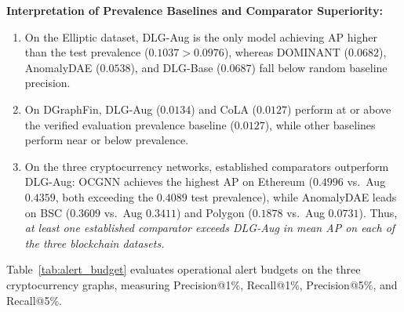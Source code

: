 \documentclass[11pt,a4paper]{article}
\begin{document}
\textbf{Interpretation of Prevalence Baselines and Comparator Superiority:}
\begin{enumerate}
    \item On the Elliptic dataset, DLG-Aug is the only model achieving AP higher than the test prevalence ($0.1037 > 0.0976$), whereas DOMINANT ($0.0682$), AnomalyDAE ($0.0538$), and DLG-Base ($0.0687$) fall below random baseline precision.
    \item On DGraphFin, DLG-Aug ($0.0134$) and CoLA ($0.0127$) perform at or above the verified evaluation prevalence baseline ($0.0127$), while other baselines perform near or below prevalence.
    \item On the three cryptocurrency networks, established comparators outperform DLG-Aug: OCGNN achieves the highest AP on Ethereum ($0.4996$ vs.\ Aug $0.4359$, both exceeding the $0.4089$ test prevalence), while AnomalyDAE leads on BSC ($0.3609$ vs.\ Aug $0.3411$) and Polygon ($0.1878$ vs.\ Aug $0.0731$). Thus, \textit{at least one established comparator exceeds DLG-Aug in mean AP on each of the three blockchain datasets.}
\end{enumerate}

Table~\ref{tab:alert_budget} evaluates operational alert budgets on the three cryptocurrency graphs, measuring Precision@1\%, Recall@1\%, Precision@5\%, and Recall@5\%.
\end{document}
